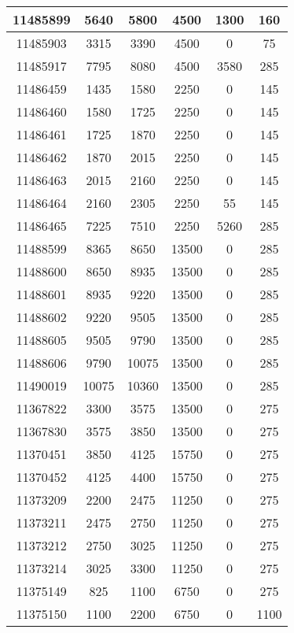 \begin{appendices}
\begin{center}
\begin{longtable}{|c|c|c|c|c|c|}
11485899 & 5640  & 5800  & 4500  & 1300  & 160 \\ \hline
11485903 & 3315  & 3390  & 4500  & 0     & 75  \\ \hline
11485917 & 7795  & 8080  & 4500  & 3580  & 285 \\ \hline
11486459 & 1435  & 1580  & 2250  & 0     & 145 \\ \hline
11486460 & 1580  & 1725  & 2250  & 0     & 145 \\ \hline
11486461 & 1725  & 1870  & 2250  & 0     & 145 \\ \hline
11486462 & 1870  & 2015  & 2250  & 0     & 145 \\ \hline
11486463 & 2015  & 2160  & 2250  & 0     & 145 \\ \hline
11486464 & 2160  & 2305  & 2250  & 55    & 145 \\ \hline
11486465 & 7225  & 7510  & 2250  & 5260  & 285 \\ \hline
11488599 & 8365  & 8650  & 13500 & 0     & 285 \\ \hline
11488600 & 8650  & 8935  & 13500 & 0     & 285 \\ \hline
11488601 & 8935  & 9220  & 13500 & 0     & 285 \\ \hline
11488602 & 9220  & 9505  & 13500 & 0     & 285 \\ \hline
11488605 & 9505  & 9790  & 13500 & 0     & 285 \\ \hline
11488606 & 9790  & 10075 & 13500 & 0     & 285 \\ \hline
11490019 & 10075 & 10360 & 13500 & 0     & 285 \\ \hline
11367822 & 3300  & 3575  & 13500 & 0     & 275  \\ \hline
11367830 & 3575  & 3850  & 13500 & 0     & 275  \\ \hline
11370451 & 3850  & 4125  & 15750 & 0     & 275  \\ \hline
11370452 & 4125  & 4400  & 15750 & 0     & 275  \\ \hline
11373209 & 2200  & 2475  & 11250 & 0     & 275  \\ \hline
11373211 & 2475  & 2750  & 11250 & 0     & 275  \\ \hline
11373212 & 2750  & 3025  & 11250 & 0     & 275  \\ \hline
11373214 & 3025  & 3300  & 11250 & 0     & 275  \\ \hline
11375149 & 825   & 1100  & 6750  & 0     & 275  \\ \hline
11375150 & 1100  & 2200  & 6750  & 0     & 1100 \\ \hline

\end{longtable}
\end{center}
\end{appendices}
